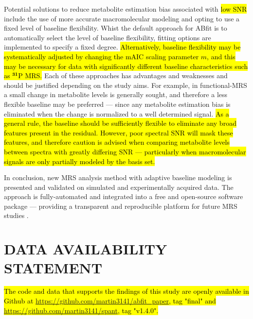 \documentclass[num-refs]{wiley-article}
\newcommand{\revone}[2]{\hl{#1}\marginnote{\hl{#2}}}
\newcommand{\revonenm}[1]{\hl{#1}} %
\begin{document}
Potential solutions to reduce metabolite estimation bias associated with \revone{low SNR}{R1.28} include the use of more accurate macromolecular modeling \cite{Birch2017} and opting to use a fixed level of baseline flexibility. Whist the default approach for ABfit is to automatically select the level of baseline flexibility, fitting options are implemented to specify a fixed degree. \revone{Alternatively, baseline flexibility may be systematically adjusted by changing the mAIC scaling parameter $m$, and this may be necessary for data with significantly different baseline characteristics such as $^{\textbf{31}}$P MRS.}{R1.14} Each of these approaches has advantages and weaknesses and should be justified depending on the study aims. For example, in functional-MRS a small change in metabolite levels is generally sought, and therefore a less flexible baseline may be preferred --- since any metabolite estimation bias is eliminated when the change is normalized to a well determined signal. \revone{As a general rule, the baseline should be sufficiently flexible to eliminate any broad features present in the residual. However, poor spectral SNR will mask these features, and therefore caution is advised when comparing metabolite levels between spectra with greatly differing SNR --- particularly when macromolecular signals are only partially modeled by the basis set.}{R1.13}

In conclusion, new MRS analysis method with adaptive baseline modeling is presented and validated on simulated and experimentally acquired data. The approach is fully-automated and integrated into a free and open-source software package --- providing a transparent and reproducible platform for future MRS studies \cite{Stikov2019}.

\section*{DATA AVAILABILITY STATEMENT}
\begin{flushleft}
    \revonenm{The code and data that supports the findings of this study are openly available in Github at \linebreak \url{https://github.com/martin3141/abfit_paper}, tag "final" and \linebreak \url{https://github.com/martin3141/spant}, tag "v1.4.0".}
\end{flushleft}

\end{document}
